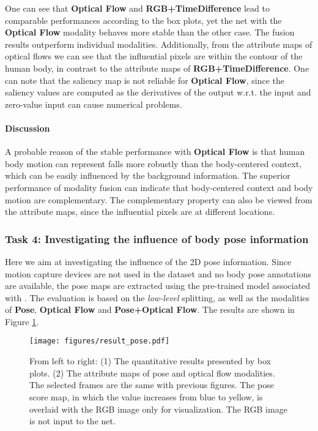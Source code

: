 \documentclass[runningheads]{llncs}
\begin{document}
One can see that {\bf Optical Flow} and {\bf RGB+TimeDifference} lead to comparable performances according to the box plots, yet the net with the {\bf Optical Flow} modality behaves more stable than the other case. The fusion results outperform individual modalities. Additionally, from the attribute maps of optical flows we can see that the influential pixels are within the contour of the human body, in contrast to the attribute maps of {\bf RGB+TimeDifference}. One can note that the saliency map is not reliable for {\bf Optical Flow}, since the saliency values are computed as the derivatives of the output w.r.t. the input and zero-value input can cause numerical problems. 

\paragraph{Discussion} A probable reason of the stable performance with {\bf Optical Flow} is that human body motion can represent falls more robustly than the body-centered context, which can be easily influenced by the background information. The superior performance of modality fusion can indicate that body-centered context and body motion are complementary. The complementary property can also be viewed from the attribute maps, since the influential pixels are at different locations. 

\subsubsection{Task 4: Investigating the influence of body pose information}

Here we aim at investigating the influence of the 2D pose information. Since motion capture devices are not used in the dataset and no body pose annotations are available, the pose maps are extracted using the pre-trained model associated with \cite{insafutdinov2016eccv} \cite{insafutdinov2017cvpr}. The evaluation is based on the {\em low-level} splitting, as well as the modalities of {\bf Pose}, {\bf Optical Flow} and {\bf Pose+Optical Flow}. The results are shown in Figure \ref{fig:pose}.


\begin{figure}
\centering
\texttt{[image: figures/result\_pose.pdf]}
\caption{From left to right: (1) The quantitative results presented by box plots. (2) The attribute maps of pose and optical flow modalities. The selected frames are the same with previous figures. The pose score map, in which the value increases from blue to yellow, is overlaid with the RGB image only for visualization. The RGB image is not input to the net. }
\label{fig:pose}
\end{figure}
\end{document}
